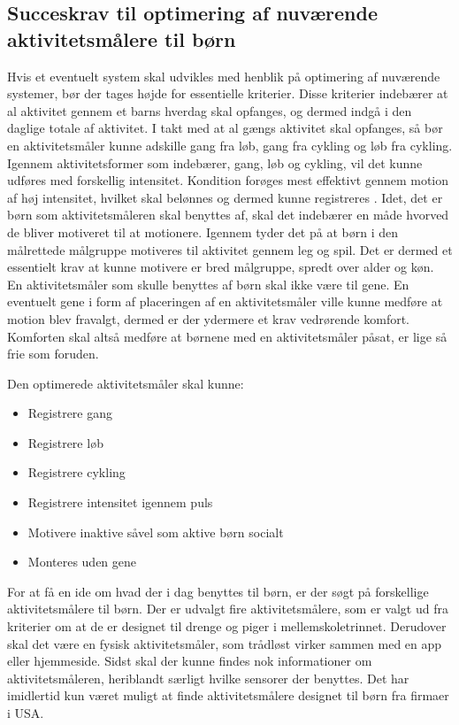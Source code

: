 \subsection{Succeskrav til optimering af nuværende aktivitetsmålere til børn}
Hvis et eventuelt system skal udvikles med henblik på optimering af nuværende systemer, bør der tages højde for essentielle kriterier. Disse kriterier indebærer at al aktivitet gennem et barns hverdag skal opfanges, og dermed indgå i den daglige totale af aktivitet. I takt med at al gængs aktivitet skal opfanges, så bør en aktivitetsmåler kunne adskille gang fra løb, gang fra cykling og løb fra cykling. Igennem aktivitetsformer som indebærer, gang, løb og cykling, vil det kunne udføres med forskellig intensitet. Kondition forøges mest effektivt gennem motion af høj intensitet, hvilket skal belønnes og dermed kunne registreres \citep{Hjerteforeningen}. Idet, det er børn som aktivitetsmåleren skal benyttes af, skal det indebærer en måde hvorved de bliver motiveret til at motionere. Igennem  tyder det på at børn i den målrettede målgruppe motiveres til aktivitet gennem leg og spil. Det er dermed et essentielt krav at kunne motivere er bred målgruppe, spredt over alder og køn. En aktivitetsmåler som skulle benyttes af børn skal ikke være til gene. En eventuelt gene i form af placeringen af en aktivitetsmåler ville kunne medføre at motion blev fravalgt, dermed er der ydermere et krav vedrørende komfort. Komforten skal altså medføre at børnene med en aktivitetsmåler påsat, er lige så frie som foruden.

Den optimerede aktivitetsmåler skal kunne: 
\begin{itemize}
\item Registrere gang
\item Registrere løb
\item Registrere cykling
\item Registrere intensitet igennem puls
\item Motivere inaktive såvel som aktive børn socialt
\item Monteres uden gene
\end{itemize}

For at få en ide om hvad der i dag benyttes til børn, er der søgt på forskellige aktivitetsmålere til børn. Der er udvalgt fire aktivitetsmålere, som er valgt ud fra kriterier om at de er designet til drenge og piger i mellemskoletrinnet. Derudover skal det være en fysisk aktivitetsmåler, som trådløst virker sammen med en app eller hjemmeside. Sidst skal der kunne findes nok informationer om aktivitetsmåleren, heriblandt særligt hvilke sensorer der benyttes. Det har imidlertid kun været muligt at finde aktivitetsmålere designet til børn fra firmaer i USA. 
